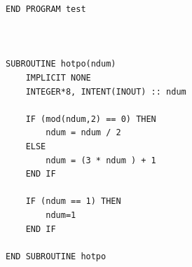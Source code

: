 \documentclass[12pt]{article}
\begin{document}
\begin{lstlisting}
END PROGRAM test 



SUBROUTINE hotpo(ndum)
    IMPLICIT NONE
    INTEGER*8, INTENT(INOUT) :: ndum

    IF (mod(ndum,2) == 0) THEN
        ndum = ndum / 2 
    ELSE
        ndum = (3 * ndum ) + 1
    END IF

    IF (ndum == 1) THEN
        ndum=1
    END IF

END SUBROUTINE hotpo 

            
        \end{lstlisting}
\end{document}
